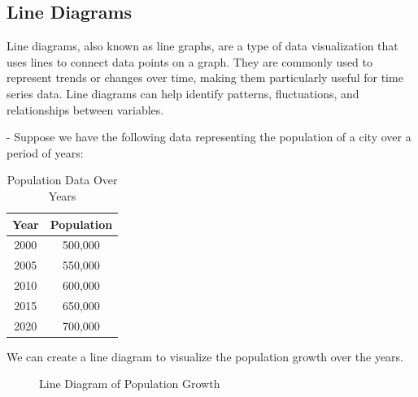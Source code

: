 \documentclass[openany]{book}
\begin{document}
\subsection{Line Diagrams}
Line diagrams, also known as line graphs, are a type of data visualization that uses lines to connect data points on a graph. They are commonly used to represent trends or changes over time, making them particularly useful for time series data. Line diagrams can help identify patterns, fluctuations, and relationships between variables. \\
\begin{example}
 - Suppose we have the following data representing the population of a city over a period of years:
\begin{table}[H]
    \centering
    \begin{tabular}{|c|c|}
        \hline
        \textbf{Year} & \textbf{Population} \\
        \hline
        2000 & 500,000 \\
        2005 & 550,000 \\
        2010 & 600,000 \\
        2015 & 650,000 \\
        2020 & 700,000 \\
        \hline
    \end{tabular}
    \caption{Population Data Over Years}
\end{table}
We can create a line diagram to visualize the population growth over the years. \\
\begin{figure}[H]
    \centering
    \caption{Line Diagram of Population Growth}
\end{figure}
\end{example}
\end{document}
